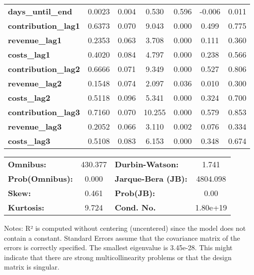\begin{center}
\begin{tabular}{lcccccc}
\textbf{days\_until\_end}             &       0.0023  &        0.004     &     0.530  &         0.596        &       -0.006    &        0.011     \\
\textbf{contribution\_lag1}           &       0.6373  &        0.070     &     9.043  &         0.000        &        0.499    &        0.775     \\
\textbf{revenue\_lag1}                &       0.2353  &        0.063     &     3.708  &         0.000        &        0.111    &        0.360     \\
\textbf{costs\_lag1}                  &       0.4020  &        0.084     &     4.797  &         0.000        &        0.238    &        0.566     \\
\textbf{contribution\_lag2}           &       0.6666  &        0.071     &     9.349  &         0.000        &        0.527    &        0.806     \\
\textbf{revenue\_lag2}                &       0.1548  &        0.074     &     2.097  &         0.036        &        0.010    &        0.300     \\
\textbf{costs\_lag2}                  &       0.5118  &        0.096     &     5.341  &         0.000        &        0.324    &        0.700     \\
\textbf{contribution\_lag3}           &       0.7160  &        0.070     &    10.255  &         0.000        &        0.579    &        0.853     \\
\textbf{revenue\_lag3}                &       0.2052  &        0.066     &     3.110  &         0.002        &        0.076    &        0.334     \\
\textbf{costs\_lag3}                  &       0.5108  &        0.083     &     6.153  &         0.000        &        0.348    &        0.674     \\
\bottomrule
\end{tabular}
\begin{tabular}{lclc}
\textbf{Omnibus:}       & 430.377 & \textbf{  Durbin-Watson:     } &    1.741  \\
\textbf{Prob(Omnibus):} &   0.000 & \textbf{  Jarque-Bera (JB):  } & 4804.098  \\
\textbf{Skew:}          &   0.461 & \textbf{  Prob(JB):          } &     0.00  \\
\textbf{Kurtosis:}      &   9.724 & \textbf{  Cond. No.          } & 1.80e+19  \\
\bottomrule
\end{tabular}
\end{center}

Notes: \newline
 [1] R² is computed without centering (uncentered) since the model does not contain a constant. \newline
 [2] Standard Errors assume that the covariance matrix of the errors is correctly specified. \newline
 [3] The smallest eigenvalue is 3.45e-28. This might indicate that there are \newline
 strong multicollinearity problems or that the design matrix is singular.